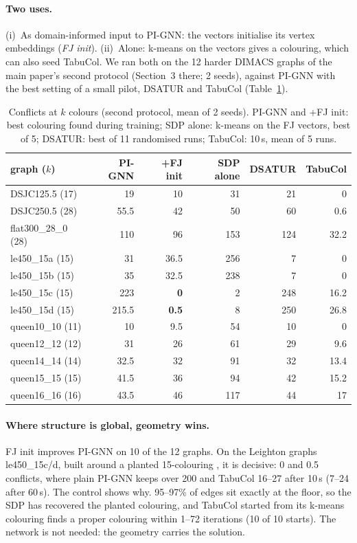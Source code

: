 \documentclass[11pt]{article}
\begin{document}
\paragraph{Two uses.} (i)~As domain-informed input to PI-GNN: the vectors initialise its vertex
embeddings (\emph{FJ init}). (ii)~Alone: k-means on the vectors gives a colouring, which can also seed
TabuCol. We ran both on the 12 harder DIMACS graphs of the main paper's second protocol (Section~3
there; 2 seeds), against PI-GNN with the best setting of a small pilot, DSATUR and TabuCol
(Table~\ref{tab:sdp}).

\begin{table}[h]
\centering\small
\begin{tabular}{@{}lrrrrr@{}}
\toprule
graph ($k$) & PI-GNN & +FJ init & SDP alone & DSATUR & TabuCol \\
\midrule
DSJC125.5 (17) & 19 & 10 & 31 & 21 & 0 \\
DSJC250.5 (28) & 55.5 & 42 & 50 & 60 & 0.6 \\
flat300\_28\_0 (28) & 110 & 96 & 153 & 124 & 32.2 \\
le450\_15a (15) & 31 & 36.5 & 256 & 7 & 0 \\
le450\_15b (15) & 35 & 32.5 & 238 & 7 & 0 \\
le450\_15c (15) & 223 & \textbf{0} & 2 & 248 & 16.2 \\
le450\_15d (15) & 215.5 & \textbf{0.5} & 8 & 250 & 26.8 \\
queen10\_10 (11) & 10 & 9.5 & 54 & 10 & 0 \\
queen12\_12 (12) & 31 & 26 & 61 & 29 & 9.6 \\
queen14\_14 (14) & 32.5 & 32 & 91 & 32 & 13.4 \\
queen15\_15 (15) & 41.5 & 36 & 94 & 42 & 15.2 \\
queen16\_16 (16) & 43.5 & 46 & 117 & 44 & 17 \\
\bottomrule
\end{tabular}
\caption{Conflicts at $k$ colours (second protocol, mean of 2 seeds). PI-GNN and +FJ init: best
colouring found during training; SDP alone: k-means on the FJ vectors, best of 5; DSATUR: best of 11
randomised runs; TabuCol: 10\,s, mean of 5 runs.}
\label{tab:sdp}
\end{table}

\paragraph{Where structure is global, geometry wins.} FJ init improves PI-GNN on 10 of the 12 graphs.
On the Leighton graphs le450\_15c/d, built around a planted 15-colouring \citep{leighton1979}, it is
decisive: 0 and 0.5 conflicts, where plain PI-GNN keeps over 200 and TabuCol 16--27 after 10\,s
(7--24 after 60\,s). The control shows why. 95--97\% of edges sit exactly at the floor, so the SDP has
recovered the planted colouring, and TabuCol started from its k-means colouring finds a proper
colouring within 1--72 iterations (10 of 10 starts). The network is not needed: the geometry carries
the solution.
\end{document}
